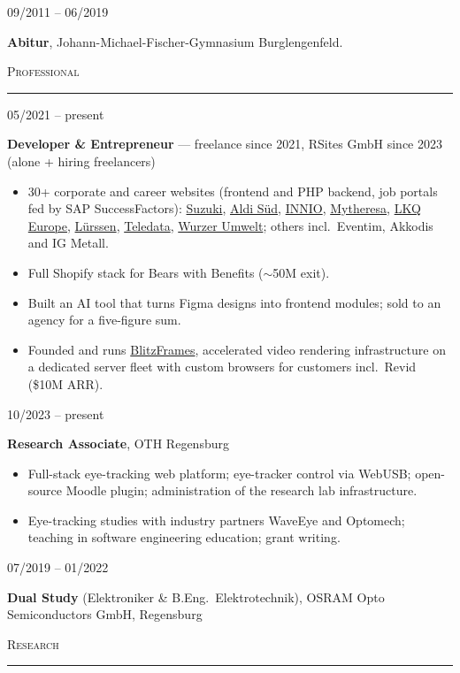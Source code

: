 \documentclass[10pt,a4paper]{article}
\newcommand{\cvsection}[1]{%
  \vspace{5pt}%
  {\large\scshape #1}\par
  \vspace{1pt}\hrule\vspace{4pt}%
}
\newlength{\datewidth}
\newcommand{\cventry}[2]{%
  \begin{minipage}[t]{\datewidth}\raggedright #1\end{minipage}%
  \hfill
  \begin{minipage}[t]{\dimexpr\textwidth-\datewidth-0.3cm\relax}#2\end{minipage}%
  \par\vspace{4pt}%
}
\begin{document}
\cventry{09/2011 -- 06/2019}{%
  \textbf{Abitur}, Johann-Michael-Fischer-Gymnasium Burglengenfeld.}

\cvsection{Professional}

\cventry{05/2021 -- present}{%
  \textbf{Developer \& Entrepreneur} --- freelance since 2021, RSites GmbH since 2023 (alone + hiring freelancers)
  \begin{itemize}
    \item 30+ corporate and career websites (frontend and PHP backend, job portals fed by SAP SuccessFactors): \href{https://karriere.suzuki.de/}{Suzuki}, \href{https://it-jobs.aldi-sued.de/}{Aldi Süd}, \href{https://careers.innio.com/de/}{INNIO}, \href{https://career.mytheresa.com/}{Mytheresa}, \href{https://www.lkqkarriere.de/}{LKQ Europe}, \href{https://jobportal.luerssen.de}{Lürssen}, \href{https://www.teledata.de/}{Teledata}, \href{https://www.wurzer-umwelt.de/}{Wurzer Umwelt}; others incl.\ Eventim, Akkodis and IG Metall.
    \item Full Shopify stack for Bears with Benefits ($\sim$\texteuro50M exit).
    \item Built an AI tool that turns Figma designs into frontend modules; sold to an agency for a five-figure sum.
    \item Founded and runs \href{https://blitzframes.com}{BlitzFrames}, accelerated video rendering infrastructure on a dedicated server fleet with custom browsers for customers incl.\ Revid (\$10M ARR).
  \end{itemize}}

\cventry{10/2023 -- present}{%
  \textbf{Research Associate}, OTH Regensburg
  \begin{itemize}
    \item Full-stack eye-tracking web platform; eye-tracker control via WebUSB; open-source Moodle plugin; administration of the research lab infrastructure.
    \item Eye-tracking studies with industry partners WaveEye and Optomech; teaching in software engineering education; grant writing.
  \end{itemize}}

\cventry{07/2019 -- 01/2022}{%
  \textbf{Dual Study} (Elektroniker \& B.Eng.\ Elektrotechnik), OSRAM Opto Semiconductors GmbH, Regensburg}

\cvsection{Research}
\end{document}
